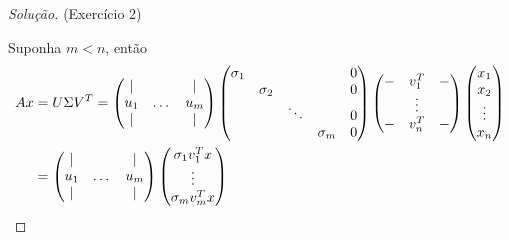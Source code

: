 \documentclass[a4paper,10pt]{article}
\newenvironment{solution}
  {\begin{proof}[Solução]}
  {\end{proof}}
\begin{document}
  \begin{solution}{(Exercício 2)}

    Suponha $m<n$, então
    \begin{equation*}
      \begin{split}
      Ax &= U\Sigma V^T = \begin{pmatrix}
          \vert & & \vert \\
          u_1 & \dots & u_m \\
          \vert & & \vert
        \end{pmatrix}
        \begin{pmatrix}
          \sigma_1 & & &  &0 \\
          &\sigma_2 & & & 0 \\
          & & \ddots & & 0 \\
          & & &\sigma_m & 0
        \end{pmatrix}
        \begin{pmatrix}
            \-- & v_1^T & \-- \\
             & \vdots &  \\
            \-- & v_n^T & \--
        \end{pmatrix}
        \begin{pmatrix}
          x_1 \\
          x_2 \\
          \vdots \\
          x_n
        \end{pmatrix} \\
        &= \begin{pmatrix}
            \vert & & \vert \\
            u_1 & \dots & u_m \\
            \vert & & \vert
          \end{pmatrix}
          \begin{pmatrix}
            \sigma_1v_1^Tx \\
            \vdots \\
            \sigma_mv_m^Tx
          \end{pmatrix}
      \end{split}
    \end{equation*}


\end{solution}
\end{document}
